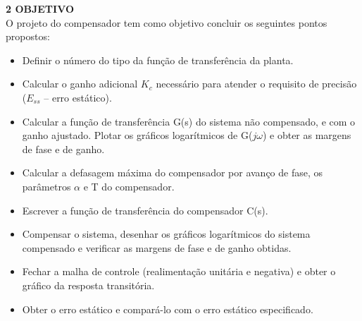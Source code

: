 \noindent \textcolor{myBlue}{\textbf{\large{2 OBJETIVO }}}\\

O projeto do compensador tem como objetivo concluir os seguintes pontos propostos:

\begin{itemize}
\item Definir o número do tipo da função de transferência da planta.
\item Calcular o ganho adicional $K_c$ necessário para atender o requisito de precisão ($E_{ss}$ – erro estático).
\item Calcular a função de transferência G(s) do sistema não compensado, e com o ganho ajustado.
Plotar os gráficos logarítmicos de G($j\omega$) e obter as margens de fase e de ganho.
\item Calcular a defasagem máxima do compensador por avanço de fase, os parâmetros $\alpha$ e T do compensador.
\item Escrever a função de transferência do compensador C(s).
\item Compensar o sistema, desenhar os gráficos logarítmicos do sistema compensado e verificar as margens de fase e de ganho obtidas.
\item Fechar a malha de controle (realimentação unitária e negativa) e obter o gráfico da resposta transitória.
\item Obter o erro estático e compará-lo com o erro estático especificado. 
\end{itemize} 
